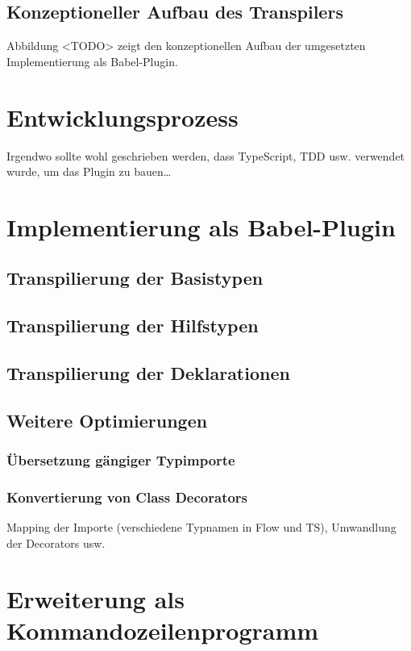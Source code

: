 \subsection{Konzeptioneller Aufbau des Transpilers}

Abbildung <TODO> zeigt den konzeptionellen Aufbau der umgesetzten Implementierung als Babel-Plugin.

\section{Entwicklungsprozess}

Irgendwo sollte wohl geschrieben werden, dass TypeScript, TDD usw. verwendet wurde, um das Plugin zu bauen\dots

\section{Implementierung als Babel-Plugin}
  \subsection{Transpilierung der Basistypen}
  \subsection{Transpilierung der Hilfstypen}
  \subsection{Transpilierung der Deklarationen}

  \subsection{Weitere Optimierungen}
    \subsubsection{Übersetzung gängiger Typimporte}
    \subsubsection{Konvertierung von Class Decorators}

  Mapping der Importe (verschiedene Typnamen in Flow und TS), Umwandlung der Decorators usw.

\section{Erweiterung als Kommandozeilenprogramm}

